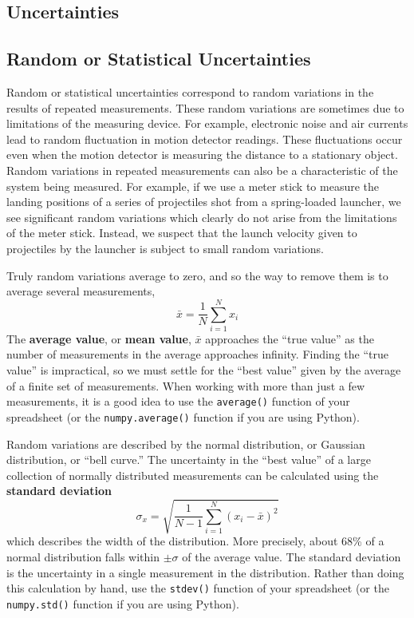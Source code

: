 \documentclass[12pt]{article}
\begin{document}
\thispagestyle{empty}

\begin{latexonly}
  \section*{Uncertainties}
\end{latexonly}

\subsection*{Random or Statistical Uncertainties}

Random or statistical uncertainties correspond to random variations in
the results of repeated measurements. These random variations are
sometimes due to limitations of the measuring device. For example,
electronic noise and air currents lead to random fluctuation in motion
detector readings. These fluctuations occur even when the motion
detector is measuring the distance to a stationary object. Random
variations in repeated measurements can also be a characteristic of
the system being measured. For example, if we use a meter stick to
measure the landing positions of a series of projectiles shot from a
spring-loaded launcher, we see significant random variations which
clearly do not arise from the limitations of the meter stick. Instead,
we suspect that the launch velocity given to projectiles by the
launcher is subject to small random variations. 

Truly random variations average to zero, and so the way to remove
them is to average several measurements,
\begin{equation}
\bar{x} = \frac{1}{N} \sum_{i=1}^N x_i
\end{equation}
The \textbf{average value}, or \textbf{mean value}, $\bar{x}$
approaches the ``true value'' as the number of measurements in the
average approaches infinity. Finding the ``true value'' is
impractical, so we must settle for the ``best value'' given by the
average of a finite set of measurements. When working with more than
just a few measurements, it is a good idea to use the
\texttt{average()} function of your spreadsheet (or the 
\texttt{numpy.average()} function if you are using Python).

Random variations are described by the normal distribution, or
Gaussian distribution, or ``bell curve.''  The uncertainty in the
``best value'' of a large collection of normally distributed
measurements can be calculated using the \textbf{standard deviation}
\begin{equation} 
\sigma_x = \sqrt{\frac{1}{N-1} \sum_{i=1}^N (x_i - \bar{x})^2} 
\end{equation}
which describes the width of the distribution. More precisely, about
68\% of a normal distribution falls within $\pm \sigma$ of the average
value. The standard deviation is the uncertainty in a single
measurement in the distribution. Rather than doing this calculation by
hand, use the \texttt{stdev()} function of your spreadsheet (or the 
\texttt{numpy.std()} function if you are using Python).
\end{document}
